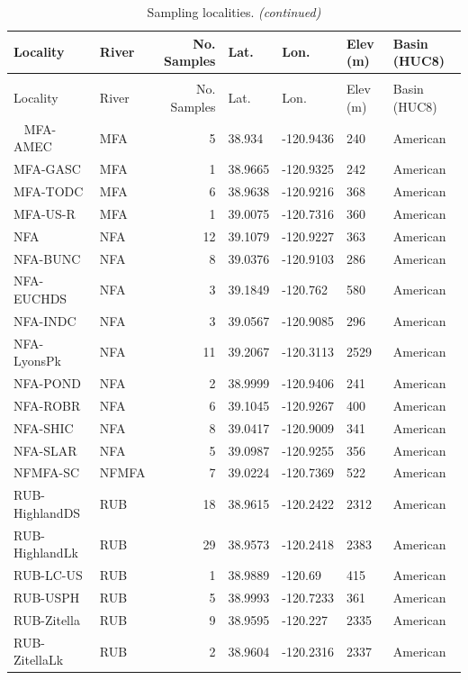 \documentclass[proquest,12pt,final]{ucthesis-CA2012} %
\begin{document}
\begin{ucmainmatter}
\begingroup\fontsize{9}{11}\selectfont
\begin{longtable}[t]{llrllll}
\caption{\label{tab:CH2T1}Sampling localities.}\\
\toprule
Locality & River & No. Samples & Lat. & Lon. & Elev (m) & Basin (HUC8)\\
\midrule
\endfirsthead
\caption[]{\label{tab:CH2T1}Sampling localities. \textit{(continued)}}\\
\toprule
Locality & River & No. Samples & Lat. & Lon. & Elev (m) & Basin (HUC8)\\
\midrule
\endhead
\
\endfoot
\bottomrule
\endlastfoot
MFA-AMEC & MFA & 5 & 38.934 & -120.9436 & 240 & American\\
MFA-GASC & MFA & 1 & 38.9665 & -120.9325 & 242 & American\\
MFA-TODC & MFA & 6 & 38.9638 & -120.9216 & 368 & American\\
MFA-US-R & MFA & 1 & 39.0075 & -120.7316 & 360 & American\\
NFA & NFA & 12 & 39.1079 & -120.9227 & 363 & American\\
\addlinespace
NFA-BUNC & NFA & 8 & 39.0376 & -120.9103 & 286 & American\\
NFA-EUCHDS & NFA & 3 & 39.1849 & -120.762 & 580 & American\\
NFA-INDC & NFA & 3 & 39.0567 & -120.9085 & 296 & American\\
NFA-LyonsPk & NFA & 11 & 39.2067 & -120.3113 & 2529 & American\\
NFA-POND & NFA & 2 & 38.9999 & -120.9406 & 241 & American\\
\addlinespace
NFA-ROBR & NFA & 6 & 39.1045 & -120.9267 & 400 & American\\
NFA-SHIC & NFA & 8 & 39.0417 & -120.9009 & 341 & American\\
NFA-SLAR & NFA & 5 & 39.0987 & -120.9255 & 356 & American\\
NFMFA-SC & NFMFA & 7 & 39.0224 & -120.7369 & 522 & American\\
RUB-HighlandDS & RUB & 18 & 38.9615 & -120.2422 & 2312 & American\\
\addlinespace
RUB-HighlandLk & RUB & 29 & 38.9573 & -120.2418 & 2383 & American\\
RUB-LC-US & RUB & 1 & 38.9889 & -120.69 & 415 & American\\
RUB-USPH & RUB & 5 & 38.9993 & -120.7233 & 361 & American\\
RUB-Zitella & RUB & 9 & 38.9595 & -120.227 & 2335 & American\\
RUB-ZitellaLk & RUB & 2 & 38.9604 & -120.2316 & 2337 & American\\

\end{longtable}
\end{ucmainmatter}
\end{document}
